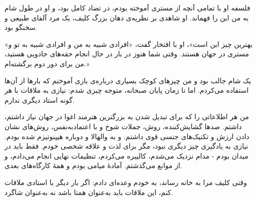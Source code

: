 فلسفه او با تمامی آنچه از مستری آموخته بودم، در تضاد کامل بود، و او در طول شام به من این را فهماند. او شاهدی بر نظریه‌ی دهان بزرگ کلیف، یک مرد آلفای طبیعی و سخنگو بود.

«بهترین چیز این است»، او با افتخار گفت، «افرادی شبیه به من و افرادی شبیه به تو و مستری در جهان هستند. وقتی شما هنوز در بار در حال انجام حقه‌های جادویی هستید، من برای دور دوم برگشته‌ام.»

یک شام جالب بود و من چیزهای کوچک بسیاری درباره‌ی بازی آموختم که بارها از آن‌ها استفاده می‌کردم. اما تا زمان پایان صبحانه، متوجه چیزی شدم: نیازی به ملاقات با هر گونه استاد دیگری ندارم.

من هر اطلاعاتی را که برای تبدیل شدن به بزرگترین هنرمند اغوا در جهان نیاز داشتم، داشتم. صدها گشایش‌کننده، روش‌، جملات شوخ و با اعتماد‌به‌نفس، روش‌های نشان دادن ارزش و تکنیک‌های جنسی قوی داشتم. و به والهالا و دوباره هیپنوتیزم شده بودم. نیازی به یادگیری چیز دیگری نبود، مگر برای لذت و علاقه شخصی خودم. فقط باید در میدان بودم - مدام نزدیک می‌شدم، کالیبره می‌کردم، تنظیمات نهایی انجام می‌دادم، و از موانع می‌گذشتم. آمادهٔ میامی بودم و همهٔ کارگاه‌های بعدی.

وقتی کلیف مرا به خانه رساند، به خودم وعده‌ای دادم: اگر بار دیگر با استادی ملاقات کنم، این ملاقات باید به‌عنوان همتا باشد نه به‌عنوان شاگرد.